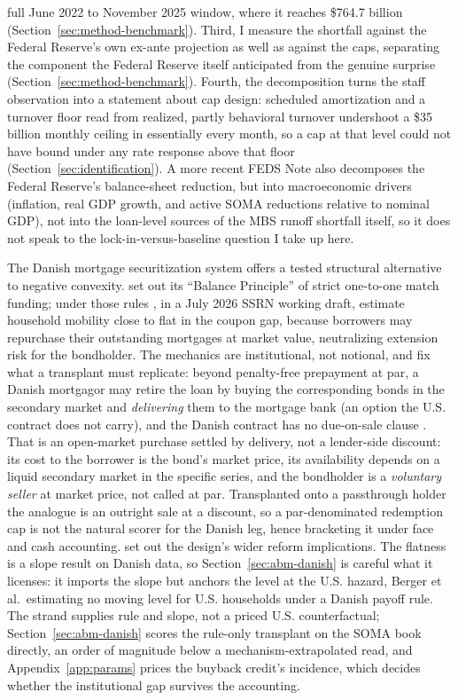 \documentclass[12pt]{article}
\begin{document}
full June 2022 to November 2025 window, where it reaches \$764.7 billion (Section~\ref{sec:method-benchmark}). Third, I measure the shortfall against the Federal Reserve's own ex-ante projection as well as against the caps, separating the component the Federal Reserve itself anticipated from the genuine surprise (Section~\ref{sec:method-benchmark}). Fourth, the decomposition turns the staff observation into a statement about cap design: scheduled amortization and a turnover floor read from realized, partly behavioral turnover undershoot a \$35 billion monthly ceiling in essentially every month, so a cap at that level could not have bound under any rate response above that floor (Section~\ref{sec:identification}). A more recent \citet{eyal2026} FEDS Note also decomposes the Federal Reserve's balance-sheet reduction, but into macroeconomic drivers (inflation, real GDP growth, and active SOMA reductions relative to nominal GDP), not into the loan-level sources of the MBS runoff shortfall itself, so it does not speak to the lock-in-versus-baseline question I take up here.

The Danish mortgage securitization system offers a tested structural alternative to negative convexity. \citet{berg2018} set out its ``Balance Principle'' of strict one-to-one match funding; under those rules \citet[\S3.3.2]{berger2026}, in a July 2026 SSRN working draft, estimate household mobility close to flat in the coupon gap, because borrowers may repurchase their outstanding mortgages at market value, neutralizing extension risk for the bondholder. The mechanics are institutional, not notional, and fix what a transplant must replicate: beyond penalty-free prepayment at par, a Danish mortgagor may retire the loan by buying the corresponding bonds in the secondary market and \emph{delivering} them to the mortgage bank (an option the U.S. contract does not carry), and the Danish contract has no due-on-sale clause \citep{frankel2004}. That is an open-market purchase settled by delivery, not a lender-side discount: its cost to the borrower is the bond's market price, its availability depends on a liquid secondary market in the specific series, and the bondholder is a \emph{voluntary seller} at market price, not called at par. Transplanted onto a passthrough holder the analogue is an outright sale at a discount, so a par-denominated redemption cap is not the natural scorer for the Danish leg, hence bracketing it under face and cash accounting. \citet{svenstrup2006} set out the design's wider reform implications. The flatness is a slope result on Danish data, so Section~\ref{sec:abm-danish} is careful what it licenses: it imports the slope but anchors the level at the U.S. hazard, Berger et al.\ estimating no moving level for U.S. households under a Danish payoff rule. The strand supplies rule and slope, not a priced U.S. counterfactual; Section~\ref{sec:abm-danish} scores the rule-only transplant on the SOMA book directly, an order of magnitude below a mechanism-extrapolated read, and Appendix~\ref{app:params} prices the buyback credit's incidence, which decides whether the institutional gap survives the accounting.
\end{document}
